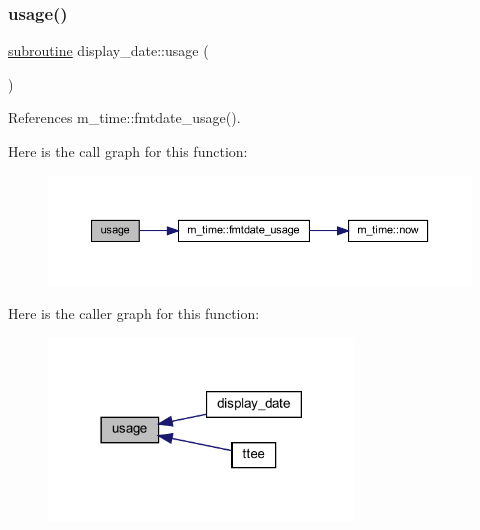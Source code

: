 \subsubsection{\texorpdfstring{usage()}{usage()}}
{\footnotesize\ttfamily \hyperlink{M__stopwatch_83_8txt_acfbcff50169d691ff02d4a123ed70482}{subroutine} display\+\_\+date\+::usage (\begin{DoxyParamCaption}{ }\end{DoxyParamCaption})}



References m\+\_\+time\+::fmtdate\+\_\+usage().

Here is the call graph for this function\+:
\nopagebreak
\begin{figure}[H]
\begin{center}
\leavevmode
\includegraphics[width=350pt]{now_8f90_a2f52503ff8f83f2a588647231e597e58_cgraph}
\end{center}
\end{figure}
Here is the caller graph for this function\+:
\nopagebreak
\begin{figure}[H]
\begin{center}
\leavevmode
\includegraphics[width=230pt]{now_8f90_a2f52503ff8f83f2a588647231e597e58_icgraph}
\end{center}
\end{figure}
